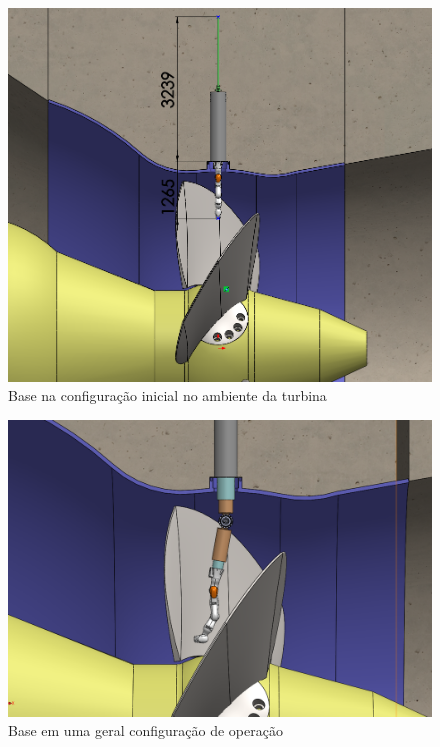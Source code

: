 \begin{figure}[H]
\centering
	\includegraphics[width=0.6\columnwidth]{sota/figs/estudo/solid/Base_Ambiente3d_Recolhida.png} 
	\caption{Base na configuração inicial no ambiente da turbina}
	\label{fig::base_ambiente3d_recolhida}
\end{figure}

\begin{figure}[H]
\centering
	\includegraphics[width=0.6\columnwidth]{sota/figs/estudo/solid/Base_Ambiente3d_Operacao.PNG} 
	\caption{Base em uma geral configuração de operação}
	\label{fig::base_ambiente3d_extendida}
\end{figure}







